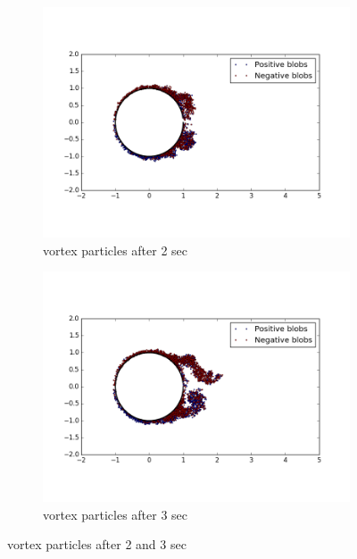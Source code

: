 \documentclass[a4paper,11pt]{article}
\begin{document}
\begin{figure}[ht]
	\centering
	\begin{subfigure}[ht]{.5\textwidth}
  		\centering
  		\includegraphics[width=.8\linewidth]{rb_2.png}
  		\caption{vortex particles after 2 sec}
  		\label{fig:16}
	\end{subfigure}
	\begin{subfigure}[ht]{.5\textwidth}
  		\centering
  		\includegraphics[width=.8\linewidth]{rb_3.png}
  		\caption{vortex particles after 3 sec}
  		\label{fig:25}
	\end{subfigure}%
	\label{fig:Question 1a}
  \caption{vortex particles after 2 and 3 sec}
\end{figure}
\end{document}
